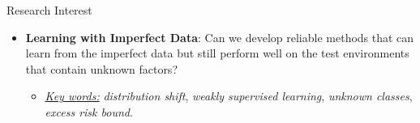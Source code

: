 \documentclass{resume} %
\begin{document}
\begin{rSection}{Research Interest}
\begin{itemize}
	\item \textbf{Learning with Imperfect Data}: Can we develop reliable methods that can learn from the imperfect data but still perform well on the test environments that contain unknown factors?
	\begin{itemize}
		\vspace{-0.5mm}
		\item \underline{\emph{Key words:}} \emph{distribution shift}, \emph{weakly supervised learning}, \emph{unknown classes}, \emph{excess risk bound}. 
	\end{itemize}

\end{itemize}
\end{rSection}
\end{document}

